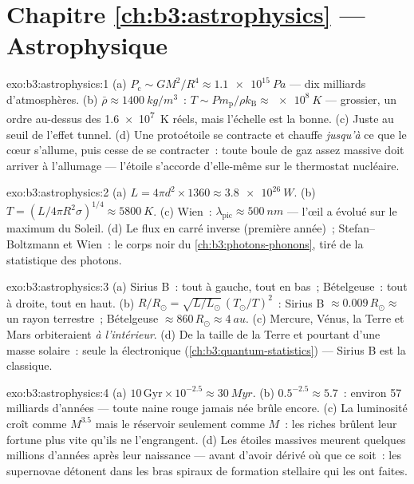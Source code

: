 \section*{Chapitre \ref{ch:b3:astrophysics} --- Astrophysique}

\begin{solution}{exo:b3:astrophysics:1}
(a) $P_{\text{c}} \sim GM^2/R^4 \approx \qty{1.1e15}{Pa}$ --- dix
milliards d'atmosphères. (b) $\bar\rho \approx \qty{1400}{kg/m^3}$~:
$T \sim P m_{\text{p}}/\rho k_{\text{B}} \approx \qty{e8}{K}$ ---
grossier, un ordre au-dessus des \qty{1.6e7}{K} réels, mais l'échelle
est la bonne. (c) Juste au seuil de l'effet tunnel. (d) Une
protoétoile se contracte et chauffe \emph{jusqu'à} ce que le cœur
s'allume, puis cesse de se contracter~: toute boule de gaz assez
massive doit arriver à l'allumage --- l'étoile s'accorde d'elle-même
sur le thermostat nucléaire.
\end{solution}

\begin{solution}{exo:b3:astrophysics:2}
(a) $L = 4\pi d^2\times1360 \approx \qty{3.8e26}{W}$. (b) $T =
(L/4\pi R^2\sigma)^{1/4} \approx \qty{5800}{K}$. (c) Wien~:
$\lambda_{\text{pic}} \approx \qty{500}{nm}$ --- l'œil a évolué sur
le maximum du Soleil. (d) Le flux en carré inverse (première
année)~; Stefan--Boltzmann et Wien~: le corps noir du
\cref{ch:b3:photons-phonons}, tiré de la statistique des photons.
\end{solution}

\begin{solution}{exo:b3:astrophysics:3}
(a) Sirius B~: tout à gauche, tout en bas~; Bételgeuse~: tout à
droite, tout en haut. (b)
$R/R_\odot = \sqrt{L/L_\odot}\,(T_\odot/T)^2$~: Sirius B
$\approx 0.009\,R_\odot \approx$ un rayon terrestre~; Bételgeuse
$\approx 860\,R_\odot \approx \qty{4}{au}$. (c) Mercure, Vénus, la
Terre et Mars orbiteraient \emph{à l'intérieur}. (d) De la taille de
la Terre et pourtant d'une masse solaire~: seule la  électronique (\cref{ch:b3:quantum-statistics}) ---
Sirius B est la  classique.
\end{solution}

\begin{solution}{exo:b3:astrophysics:4}
(a) $10\,\text{Gyr}\times10^{-2.5} \approx \qty{30}{Myr}$. (b)
$0.5^{-2.5} \approx 5.7$~: environ 57 milliards d'années --- toute
naine rouge jamais née brûle encore. (c) La luminosité croît comme
$M^{3.5}$ mais le réservoir seulement comme $M$~: les riches brûlent
leur fortune plus vite qu'ils ne l'engrangent. (d) Les étoiles
massives meurent quelques millions d'années après leur naissance ---
avant d'avoir dérivé où que ce soit~: les supernovae détonent dans
les bras spiraux de formation stellaire qui les ont faites.
\end{solution}

